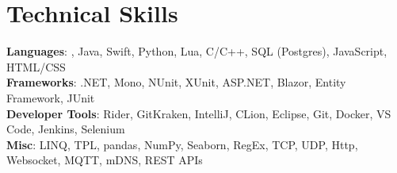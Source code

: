 \section{Technical Skills}
 \begin{itemize}[leftmargin=0.15in, label={}]
    \small{\item{

    
     \textbf{Languages}{: \csharp, Java, Swift, Python, Lua, C/C++, SQL (Postgres), JavaScript, HTML/CSS} \\

     
     \textbf{Frameworks}{: .NET, Mono, NUnit, XUnit, ASP.NET, Blazor, Entity Framework, JUnit} \\

     
     \textbf{Developer Tools}{: Rider, GitKraken, IntelliJ, CLion, Eclipse, Git, Docker, VS Code, Jenkins, Selenium} \\

     
     \textbf{Misc}{: LINQ, TPL, pandas, NumPy, Seaborn, RegEx, TCP, UDP, Http, Websocket, MQTT, mDNS, REST APIs}
    }}
\end{itemize}